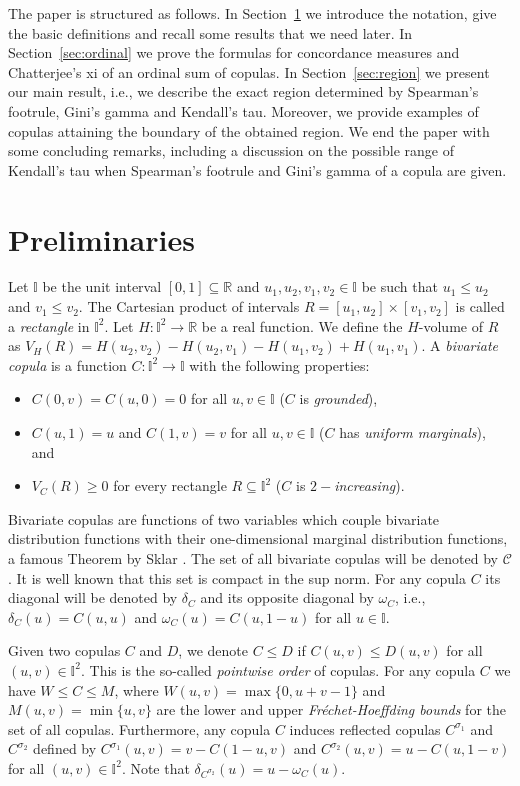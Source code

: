 \documentclass[12pt,a4paper]{amsart}
\theoremstyle{definition}
\newcommand{\II}{\mathbb{I}}
\newcommand{\RR}{\mathbb{R}}
\newcommand{\CC}{\mathcal{C}}
\begin{document}
The paper is structured as follows. In Section~\ref{sec:prelim} we introduce the notation, give the basic definitions and recall some results that we need later. In Section~\ref{sec:ordinal} we prove the formulas for concordance measures and Chatterjee's xi of an ordinal sum of copulas. In Section~\ref{sec:region} we present our main result, i.e., we describe the exact region determined by Spearman's footrule, Gini's gamma and Kendall's tau. Moreover, we provide examples of copulas attaining the boundary of the obtained region. We end the paper with some concluding remarks, including a discussion on the possible range of Kendall's tau when  Spearman's footrule and Gini's gamma of a copula are given.





\section{Preliminaries} \label{sec:prelim}

Let $\II$ be the unit interval $[0,1]\subseteq\RR$ and $u_1, u_2, v_1, v_2 \in \II$ be such that $u_1 \le u_2$ and $v_1 \le v_2$. The Cartesian product of intervals $R=[u_1,u_2]\times [v_1,v_2]$ is called a {\it rectangle} in $\II^2$. Let $H:\II^2 \to \RR$ be a real function. We define the $H$-volume of $R$ as
$V_H(R)=H(u_2,v_2)-H(u_2,v_1)-H(u_1,v_2)+H(u_1,v_1)$.
A {\it bivariate copula} is a function $C:\II^2 \to \II$ with the following properties:
\begin{itemize}
    \item $C(0,v)=C(u,0)=0$ for all $u,v \in \II$ ($C$ is {\it grounded}),
    \item $C(u,1)=u$ and $C(1,v)=v$ for all $u,v \in \II$ ($C$ has {\it uniform marginals}), and
    \item $V_C(R) \geq 0$ for every rectangle $R \subseteq \II^2$ ($C$ is {\it $2-$increasing}).
\end{itemize}
Bivariate copulas are functions of two variables which couple bivariate distribution functions with their one-dimensional marginal distribution functions, a famous Theorem by Sklar \cite{Sklar}.
The set of all bivariate copulas will be denoted by $\CC$. It is well known that this set is compact in the sup norm. For any copula $C$ its diagonal will be denoted by $\delta_C$ and its opposite diagonal by $\omega_C$, i.e., $\delta_C(u)=C(u,u)$ and $\omega_C(u)=C(u,1-u)$ for all $u \in \II$.

Given two copulas $C$ and $D$, we denote $C\le D$ if $C(u,v)\leqslant D(u,v)$ for all $(u,v)\in\II^2$. This is the so-called \textit{pointwise order} of copulas.
For any copula $C$ we have $W \le C \le M$, where $W(u,v)=\max\{0,u+v-1\}$ and $M(u,v)=\min\{u,v\}$ are the lower and upper \textit{Fr\'echet-Hoeffding bounds} for the set of all copulas.
Furthermore, any copula $C$ induces reflected copulas $C^{\sigma_1}$ and $C^{\sigma_2}$ defined by $C^{\sigma_1}(u,v) =v-C(1-u,v)$ and $C^{\sigma_2}(u,v)=u-C(u,1-v)$ for all $(u,v) \in \II^2$. Note that $\delta_{C^{\sigma_2}}(u)=u-\omega_C(u)$. 
\end{document}
